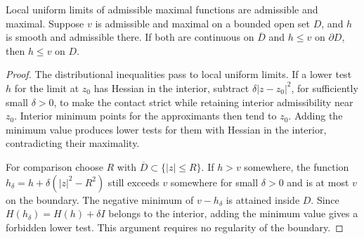 \begin{lemma}\label{draft:596-hessian-cone-stability}
Local uniform limits of admissible maximal functions are admissible and maximal. Suppose $v$ is admissible and maximal on a bounded open set $D$, and $h$ is smooth and admissible there. If both are continuous on $\overline D$ and $h\leq v$ on $\partial D$, then $h\leq v$ on $D$.
\end{lemma}
\begin{proof}
The distributional inequalities pass to local uniform limits. If a lower test $h$ for the limit at $z_0$ has Hessian in the interior, subtract $\delta|z-z_0|^2$, for sufficiently small $\delta>0$, to make the contact strict while retaining interior admissibility near $z_0$. Interior minimum points for the approximants then tend to $z_0$. Adding the minimum value produces lower tests for them with Hessian in the interior, contradicting their maximality.

For comparison choose $R$ with $\overline D\subset\{|z|\leq R\}$. If $h>v$ somewhere, the function $h_\delta=h+\delta(|z|^2-R^2)$ still exceeds $v$ somewhere for small $\delta>0$ and is at most $v$ on the boundary. The negative minimum of $v-h_\delta$ is attained inside $D$. Since $H(h_\delta)=H(h)+\delta I$ belongs to the interior, adding the minimum value gives a forbidden lower test. This argument requires no regularity of the boundary.
\end{proof}

